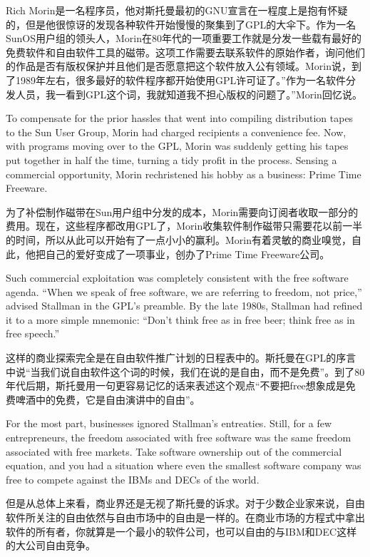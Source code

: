 \ifdefined\chs
Rich Morin是一名程序员，他对斯托曼最初的GNU宣言在一程度上是抱有怀疑的，但是他很惊讶的发现各种软件开始慢慢的聚集到了GPL的大伞下。作为一名 SunOS用户组的领头人，Morin在80年代的一项重要工作就是分发一些载有最好的免费软件和自由软件工具的磁带。这项工作需要去联系软件的原始作者，询问他们的作品是否有版权保护并且他们是否愿意把这个软件放入公有领域。Morin说，到了1989年左右，很多最好的软件程序都开始使用GPL许可证了。''作为一名软件分发人员，我一看到GPL这个词，我就知道我不担心版权的问题了。''Morin回忆说。
\fi

\ifdefined\eng
To compensate for the prior hassles that went into compiling distribution tapes to the Sun User Group, Morin had charged recipients a convenience fee. Now, with programs moving over to the GPL, Morin was suddenly getting his tapes put together in half the time, turning a tidy profit in the process. Sensing a commercial opportunity, Morin rechristened his hobby as a business: Prime Time Freeware.
\fi

\ifdefined\chs
为了补偿制作磁带在Sun用户组中分发的成本，Morin需要向订阅者收取一部分的费用。现在，这些程序都改用GPL了，Morin收集软件制作磁带只需要花以前一半的时间，所以从此可以开始有了一点小小的赢利。Morin有着灵敏的商业嗅觉，自此，他把自己的爱好变成了一项事业，创办了Prime Time Freeware公司。
\fi

\ifdefined\eng
Such commercial exploitation was completely consistent with the free software agenda. ``When we speak of free software, we are referring to freedom, not price,'' advised Stallman in the GPL's preamble. By the late 1980s, Stallman had refined it to a more simple mnemonic: ``Don't think free as in free beer; think free as in free speech.''
\fi

\ifdefined\chs
这样的商业探索完全是在自由软件推广计划的日程表中的。斯托曼在GPL的序言中说``当我们说自由软件这个词的时候，我们在说的是自由，而不是免费''。到了80年代后期，斯托曼用一句更容易记忆的话来表述这个观点``不要把free想象成是免费啤酒中的免费，它是自由演讲中的自由''。
\fi

\ifdefined\eng
For the most part, businesses ignored Stallman's entreaties. Still, for a few entrepreneurs, the freedom associated with free software was the same freedom associated with free markets. Take software ownership out of the commercial equation, and you had a situation where even the smallest software company was free to compete against the IBMs and DECs of the world.
\fi

\ifdefined\chs
但是从总体上来看，商业界还是无视了斯托曼的诉求。对于少数企业家来说，自由软件所关注的自由依然与自由市场中的自由是一样的。在商业市场的方程式中拿出软件的所有者，你就算是一个最小的软件公司，也可以自由的与IBM和DEC这样的大公司自由竞争。
\fi

